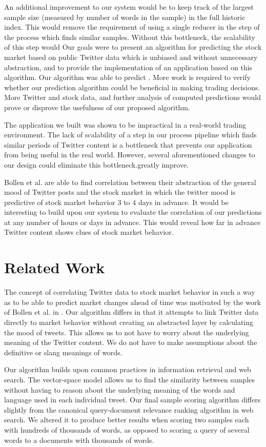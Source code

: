 \documentclass[twocolumn]{article}
\begin{document}
An additional improvement to our system would be to keep track of the largest sample size (measured by number of words in the sample) in the full historic index. This would remove the requirement of using a single reducer in the step of the process which finds similar samples. Without this bottleneck, the scalability of this step would Our goals were to present an algorithm for predicting the stock market based on public Twitter data which is unbiased and without unnecessary abstraction, and to provide the implementation of an application based on this algorithm. Our algorithm was able to predict . More work is required to verify whether our prediction algorithm could be beneficial in making trading decisions. More Twitter and stock data, and further analysis of computed predictions would prove or disprove the usefulness of our proposed algorithm.

The application we built was shown to be impractical in a real-world trading environment. The lack of scalability of a step in our process pipeline which finds similar periods of Twitter content is a bottleneck that prevents our application from being useful in the real world. However, several aforementioned changes to our design could eliminate this bottleneck.greatly improve.

Bollen et al. are able to find correlation between their abstraction of the general mood of Twitter posts and the stock market in which the twitter mood is predictive of stock market behavior 3 to 4 days in advance. It would be interesting to build upon our system to evaluate the correlation of our predictions at any number of hours or days in advance. This would reveal how far in advance Twitter content shows clues of stock market behavior.

\section{Related Work}
The concept of correlating Twitter data to stock market behavior in such a way as to be able to predict market changes ahead of time was motivated by the work of Bollen et al. in \cite{bollen}. Our algorithm differs in that it attempts to link Twitter data directly to market behavior without creating an abstracted layer by calculating the mood of tweets. This allows us to not have to worry about the underlying meaning of the Twitter content. We do not have to make assumptions about the definitive or slang meanings of words.

Our algorithm builds upon common practices in information retrieval and web search. The vector-space model allows us to find the similarity between samples without having to reason about the underlying meaning of the words and language used in each individual tweet. Our final sample scoring algorithm differs slightly from the canonical query-document relevance ranking algorithm in web search. We altered it to produce better results when scoring two samples each with hundreds of thousands of words, as opposed to scoring a query of several words to a documents with thousands of words.
\end{document}
